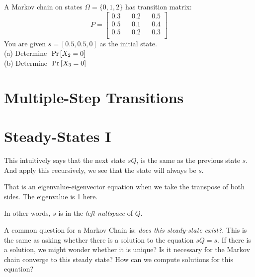 \frmrule


\begin{example}
A Markov chain on states $\Omega = \{0,1,2\}$ has transition matrix:
$$ P = 
\begin{bmatrix} 
0.3 && 0.2 && 0.5 \\ 
0.5 && 0.1 && 0.4 \\
0.5 && 0.2 && 0.3 \\
\end{bmatrix}
$$
You are given $s = [0.5,0.5,0]$ as the initial state. \\
(a) Determine $\;\text{Pr}\left[X_2 = 0\right]\;$ \\
(b) Determine $\;\text{Pr}\left[X_3 = 0\right]\;$ 
\end{example}




\section{Multiple-Step Transitions}





\section{Steady-States I}


This intuitively says that the next state $sQ$, is the same as the previous state $s$. 
And apply this recursively, we see that the state will always be $s$. 

That is an eigenvalue-eigenvector equation when we take the transpose of both sides. 
The eigenvalue is 1 here. 


In other words, $s$ is in the \textit{left-nullspace} of $Q$. 

A common question for a Markov Chain is: \textit{does this steady-state exist?}. 
This is the same as asking whether there is a solution to the equation $sQ = s$. 
If there is a solution, we might wonder whether it is unique? 
Is it necessary for the Markov chain converge to this steady state?
How can we compute solutions for this equation?

\frmrule


